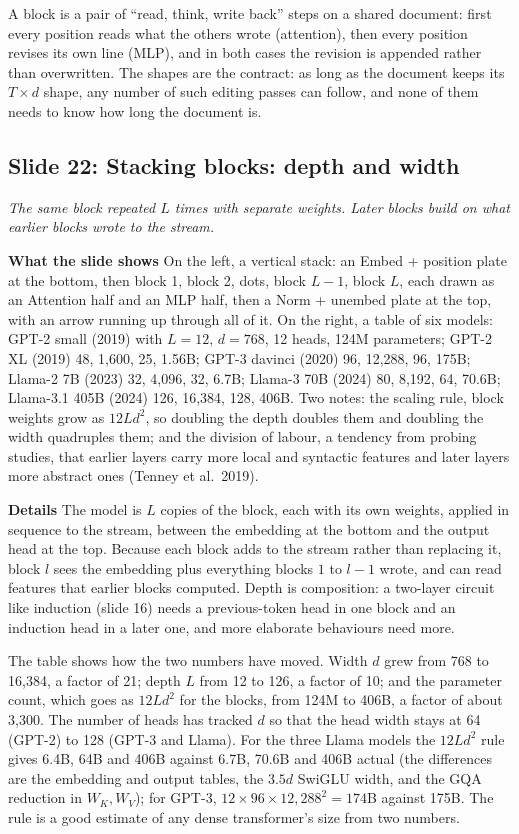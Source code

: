 \documentclass[11pt,letterpaper]{article}
\newcommand{\slide}[3]{%
  \subsection[Slide #1: #2]{Slide #1: #2}%
  {\color{muted}\itshape #3\par}\medskip}
\newcommand{\para}[1]{\medskip\noindent\textbf{#1}\quad}
\newenvironment{intuition}{\begin{tcolorbox}[intuitionbox]}{\end{tcolorbox}}
\begin{document}
\begin{intuition}
A block is a pair of ``read, think, write back'' steps on a shared document: first every position reads what the others wrote (attention), then every position revises its own line (MLP), and in both cases the revision is appended rather than overwritten. The shapes are the contract: as long as the document keeps its $T\times d$ shape, any number of such editing passes can follow, and none of them needs to know how long the document is.
\end{intuition}

\slide{22}{Stacking blocks: depth and width}{The same block repeated $L$ times with separate weights. Later blocks build on what earlier blocks wrote to the stream.}

\para{What the slide shows} On the left, a vertical stack: an Embed + position plate at the bottom, then block 1, block 2, dots, block $L-1$, block $L$, each drawn as an Attention half and an MLP half, then a Norm + unembed plate at the top, with an arrow running up through all of it. On the right, a table of six models: GPT-2 small (2019) with $L=12$, $d=768$, 12 heads, 124M parameters; GPT-2 XL (2019) 48, 1,600, 25, 1.56B; GPT-3 davinci (2020) 96, 12,288, 96, 175B; Llama-2 7B (2023) 32, 4,096, 32, 6.7B; Llama-3 70B (2024) 80, 8,192, 64, 70.6B; Llama-3.1 405B (2024) 126, 16,384, 128, 406B. Two notes: the scaling rule, block weights grow as $12Ld^2$, so doubling the depth doubles them and doubling the width quadruples them; and the division of labour, a tendency from probing studies, that earlier layers carry more local and syntactic features and later layers more abstract ones (Tenney et al.\ 2019).

\para{Details} The model is $L$ copies of the block, each with its own weights, applied in sequence to the stream, between the embedding at the bottom and the output head at the top. Because each block adds to the stream rather than replacing it, block $l$ sees the embedding plus everything blocks $1$ to $l-1$ wrote, and can read features that earlier blocks computed. Depth is composition: a two-layer circuit like induction (slide 16) needs a previous-token head in one block and an induction head in a later one, and more elaborate behaviours need more.

The table shows how the two numbers have moved. Width $d$ grew from 768 to 16,384, a factor of 21; depth $L$ from 12 to 126, a factor of 10; and the parameter count, which goes as $12Ld^2$ for the blocks, from 124M to 406B, a factor of about 3,300. The number of heads has tracked $d$ so that the head width stays at 64 (GPT-2) to 128 (GPT-3 and Llama). For the three Llama models the $12Ld^2$ rule gives 6.4B, 64B and 406B against 6.7B, 70.6B and 406B actual (the differences are the embedding and output tables, the $3.5d$ SwiGLU width, and the GQA reduction in $W_K,W_V$); for GPT-3, $12\times96\times12{,}288^2=174$B against 175B. The rule is a good estimate of any dense transformer's size from two numbers.
\end{document}
